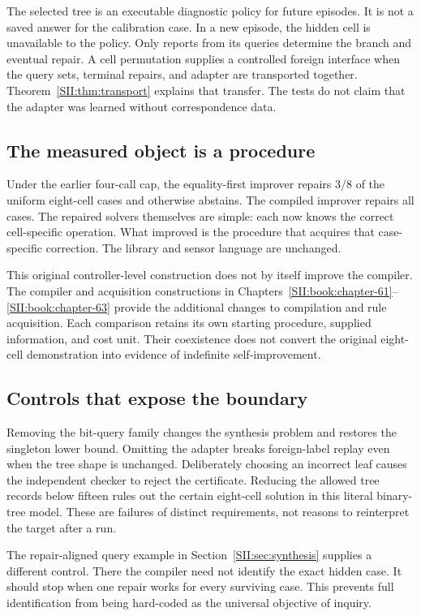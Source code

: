 The selected tree is an executable diagnostic policy for future episodes. It is not a saved answer for the calibration case. In a new episode, the hidden cell is unavailable to the policy. Only reports from its queries determine the branch and eventual repair. A cell permutation supplies a controlled foreign interface when the query sets, terminal repairs, and adapter are transported together. Theorem~\ref{SII:thm:transport} explains that transfer. The tests do not claim that the adapter was learned without correspondence data.

\subsection{The measured object is a procedure}
Under the earlier four-call cap, the equality-first improver repairs $3/8$ of the uniform eight-cell cases and otherwise abstains. The compiled improver repairs all cases. The repaired solvers themselves are simple: each now knows the correct cell-specific operation. What improved is the procedure that acquires that case-specific correction. The library and sensor language are unchanged.

This original controller-level construction does not by itself improve the compiler. The compiler and acquisition constructions in Chapters~\ref{SII:book:chapter-61}--\ref{SII:book:chapter-63} provide the additional changes to compilation and rule acquisition. Each comparison retains its own starting procedure, supplied information, and cost unit. Their coexistence does not convert the original eight-cell demonstration into evidence of indefinite self-improvement.

\subsection{Controls that expose the boundary}
Removing the bit-query family changes the synthesis problem and restores the singleton lower bound. Omitting the adapter breaks foreign-label replay even when the tree shape is unchanged. Deliberately choosing an incorrect leaf causes the independent checker to reject the certificate. Reducing the allowed tree records below fifteen rules out the certain eight-cell solution in this literal binary-tree model. These are failures of distinct requirements, not reasons to reinterpret the target after a run.

The repair-aligned query example in Section~\ref{SII:sec:synthesis} supplies a different control. There the compiler need not identify the exact hidden case. It should stop when one repair works for every surviving case. This prevents full identification from being hard-coded as the universal objective of inquiry.

